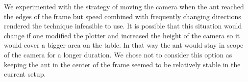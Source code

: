We experimented with the strategy of moving the camera when the ant reached the edges of the frame but speed combined with frequently changing directions rendered the technique infeasible to use. It is possible that this situation would change if one modified the plotter and increased the height of the camera so it would cover a bigger area on the table. In that way the ant would stay in scope of the camera for a longer duration. We chose not to consider this option as keeping the ant in the center of the frame seemed to be relatively stable in the current setup.

%



